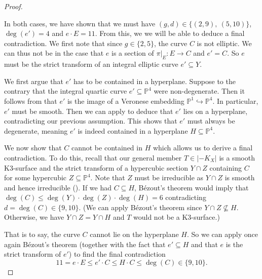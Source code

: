 \documentclass[english,11pt,reqno]{amsart}
\newcommand{\sub}{\subseteq}
\newcommand{\Pone}{\mathbb{P}^1}
\newcommand{\Pfour}{\mathbb{P}^4}
\begin{document}
\begin{proof}
\begin{itemize}
\end{itemize}
In both cases, we have shown that we must have $(g,d)\in\{(2,9),\:(5,10)\}$, $\deg(e')=4$ and $e\cdot E=11$. From this, we we will be able to deduce a final contradiction. We first note that since $g\in\{2,5\}$, the curve $C$ is not elliptic. We can thus not be in the case that $e$ is a section of $\pi|_E:E\rightarrow C$ and $e'=C$. So $e$ must be the strict transform of an integral elliptic curve $e'\sub Y$. \par 
We first argue that $e'$ has to be contained in a hyperplane. Suppose to the contrary that the integral quartic curve $e'\sub \Pfour$ were non-degenerate. Then it follows from \cite[p.\ 179]{Griffiths_Harris_Principles_of_Alg_Geom} that $e'$ is the image of a Veronese embedding $\Pone \hookrightarrow \Pfour$. In particular, $e'$ must be smooth. Then we can apply  to deduce that $e'$ lies on a hyperplane, contradicting our previous assumption. This shows that $e'$ must always be degenerate, meaning $e'$ is indeed contained in a hyperplane $H\sub \Pfour$. \par 
We now show that $C$ cannot be contained in $H$ which allows us to derive a final contradiction. To do this, recall that our general member $T\in|-K_X|$ is a smooth K3-surface and the strict transform of a hypercubic section $Y\cap Z$ containing $C$ for some hypercubic $Z\sub \Pfour$. Note that $Z$ must be irreducible as $Y\cap Z$ is smooth and hence irreducible (). If we had $C\sub H$, Bézout's theorem would imply that $\deg(C)\leq \deg(Y)\cdot \deg(Z)\cdot \deg(H)=6$ contradicting $d=\deg(C)\in\{9,10\}$. (We can apply Bézout's theorem since $Y\cap Z\not \sub H$. Otherwise, we have $Y\cap Z=Y\cap H$ and $T$ would not be a K3-surface.) \par 
That is to say, the curve $C$ cannot lie on the hyperplane $H$. So we can apply once again Bézout's theorem (together with the fact that $e'\sub H$ and that $e$ is the strict transform of $e'$) to find the final contradiction
$$ 11=e\cdot E \leq e'\cdot C \leq H \cdot C \leq \deg(C) \in \{9,10\}.$$
\end{proof}
%
%
\end{document}
